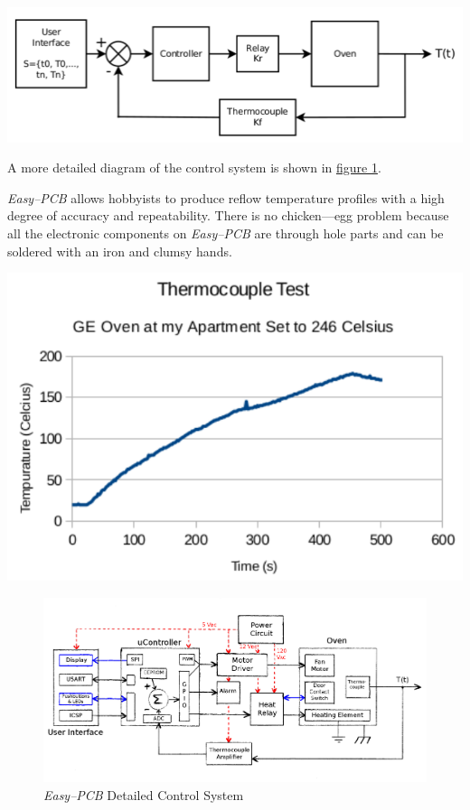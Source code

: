 \documentclass[10pt, twocolumn]{article}
\begin{document}
\begin{center}
	\includegraphics[width=\columnwidth]{Figures/control-system.pdf}
\end{center}

A more detailed diagram of the control system is shown in
\hyperref[detailed-system-diagram]{figure \ref{detailed-system-diagram}}.

\emph{Easy--PCB} allows hobbyists to produce reflow temperature profiles with
a high degree of accuracy and repeatability.
There is no chicken---egg problem because all the electronic components
on \emph{Easy--PCB}
are through hole parts and can be soldered with an iron and clumsy hands.

\begin{center}
	\includegraphics[width=\columnwidth]{Figures/control-results.pdf}
	\label{temperature-control-results}
\end{center}

\begin{figure}
	\centering
	\includegraphics[width=\textwidth]{Figures/detailed-system-diagram.pdf}
	\caption{\emph{Easy--PCB} Detailed Control System}
	\label{detailed-system-diagram}
\end{figure}
\end{document}
